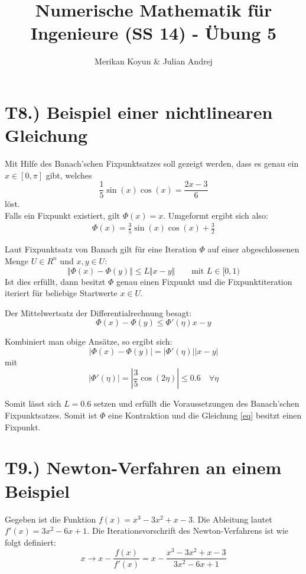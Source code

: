 \documentclass[11pt]{article}
\theoremstyle{plain}
\theoremstyle{definition}
\renewcommand{\a}{\"{a}}
\renewcommand{\o}{\"{o}}
\renewcommand{\u}{\"{u}}
\begin{document}
\title{Numerische Mathematik f\u r Ingenieure (SS 14) - \"{U}bung 5}
\author{Merikan Koyun \& Julian Andrej}
\maketitle

\section*{T8.) Beispiel einer nichtlinearen Gleichung}
Mit Hilfe des Banach'schen Fixpunktsatzes soll gezeigt werden, dass es genau ein $x \in [0,\pi]$ gibt, welches 
\begin{equation}
\frac{1}{5}\sin(x)\cos(x) = \frac{2x-3}{6}
\label{eq}
\end{equation}
l\o st.\\
Falls ein Fixpunkt existiert, gilt $\Phi(x) = x$. Umgeformt ergibt sich also:
\begin{align}
\Phi(x) = \frac{3}{5}\sin(x)\cos(x)+\frac{3}{2}
\end{align}

Laut Fixpunktsatz von Banach gilt f\u r eine Iteration $\Phi$ auf einer abgeschlossenen Menge $U \in R^n$ und $x,y \in U$:
\begin{equation}
\Vert \Phi(x)-\Phi(y) \Vert \leq L \Vert x-y \Vert \qquad \text{mit } L \in [0,1)
\end{equation}
Ist dies erf\u llt, dann besitzt $\Phi$ genau einen Fixpunkt und die Fixpunktiteration iteriert f\u r beliebige Startwerte $x \in U$.

Der Mittelwertsatz der Differentialrechnung besagt:
\begin{equation}
\Phi(x)-\Phi(y) \leq \Phi'(\eta) x-y
\end{equation}

Kombiniert man obige Ans\a tze, so ergibt sich:
\begin{equation}
|\Phi(x)- \Phi(y) | = |\Phi'(\eta)||x-y|
\end{equation}
mit
\begin{equation}
|\Phi'(\eta)| = \left|\frac{3}{5}\cos(2 \eta)\right| \leq 0.6 \quad \forall \eta
\end{equation}

Somit l\a sst sich $L=0.6$ setzen und erf\u llt die Voraussetzungen des Banach'schen Fixpunktsatzes. Somit ist $\Phi$ eine Kontraktion und die Gleichung \eqref{eq} besitzt einen Fixpunkt.

\section*{T9.) Newton-Verfahren an einem Beispiel}
Gegeben ist die Funktion $f(x)=x^3 - 3x^2 + x -3$. Die Ableitung lautet $f'(x)=3x^2 - 6x+1$. Die Iterationsvorschrift des Newton-Verfahrens ist wie folgt definiert:
\begin{equation}
x \rightarrow x - \dfrac{f(x)}{f'(x)} = x - \dfrac{x^3 - 3x^2 + x -3}{3x^2 - 6x+1}
\end{equation}
\end{document}
